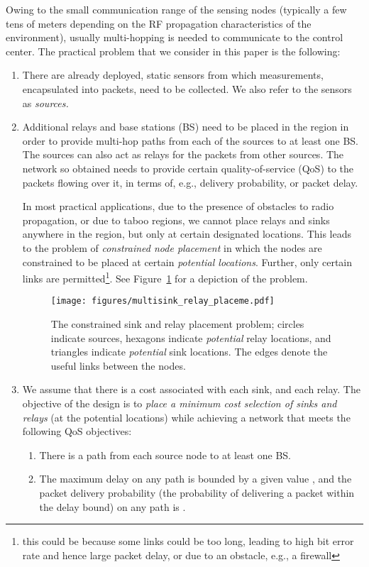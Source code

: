 \documentclass[conference]{IEEEtran}
\begin{document}
Owing to the small communication range of the sensing nodes (typically a few tens of meters depending on the RF propagation characteristics of the environment), usually multi-hopping is needed to communicate to the control center. The practical problem that we consider in this paper is the following:

\begin{enumerate}
\item There are already deployed, static sensors from which measurements, encapsulated into packets, need to be collected. We also refer to the sensors as \emph{sources.}
\item Additional relays and base stations (BS) need to be placed in the region in order to provide multi-hop paths from each of the sources to at least one BS. The sources can also act as relays for the packets from other sources. The network so obtained needs to provide certain quality-of-service (QoS) to the packets flowing over it, in terms of, e.g., delivery probability, or packet delay. 

In most practical applications, due to the presence of obstacles to radio propagation, or due to taboo regions, we cannot place relays and sinks anywhere in the region, but only at certain designated locations. This leads to the problem of \emph{constrained node placement} in which the nodes are constrained to be placed at certain \emph{potential locations}. Further, only certain links are permitted\footnote{this could be because some links could be too long, leading to high bit error rate and hence large packet delay, or due to an obstacle, e.g., a firewall}. See Figure~\ref{fig:constrained} for a depiction of the problem.

\begin{figure}[t]
\begin{center}
\texttt{[image: figures/multisink\_relay\_placeme.pdf]}
\end{center}
\caption{The constrained sink and relay placement problem; circles indicate sources, hexagons indicate \emph{potential} relay locations, and triangles indicate \emph{potential} sink locations. The edges denote the useful links between the nodes.}
\label{fig:constrained}
\end{figure} 

\item We assume that there is a cost associated with each sink, and each relay. The objective of the design is to \emph{place a minimum cost selection of sinks and relays} (at the potential locations) while achieving a network that meets the following QoS objectives:
\begin{enumerate}
\item There is a path from each source node to at least one BS.
\item The maximum delay on any path is bounded by a given value , and the packet delivery probability (the probability of delivering a packet within the delay bound) on any path is .
\end{enumerate}
\end{enumerate}
\end{document}
